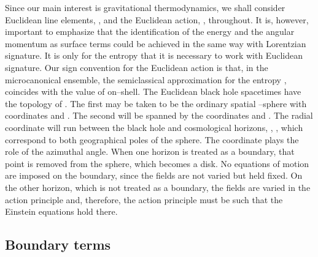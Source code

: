 \documentclass[a4paper,preprintnumbers,amsmath,amssymb]{revtex4}
\begin{document}
Since our main interest is gravitational thermodynamics, we shall consider Euclidean line elements, \coordHE{}, and the Euclidean action, \coordHE{}, throughout. It is, however,
important to emphasize that the identification of the energy and the angular momentum as surface terms could be achieved in the same way with Lorentzian signature. It
is only for the entropy that it is necessary to work with  Euclidean signature. Our sign convention for the Euclidean action is that, in the microcanonical ensemble, the
semiclassical approximation for the entropy \coordHE{}, coincides with the value of \coordHE{} on--shell. The Euclidean black hole spacetimes have the topology of \coordHE{}. The first \coordHE{} may be taken to be the ordinary spatial \coordHE{}--sphere with coordinates \myHighlight{$\theta$}\coordHE{} and \myHighlight{$\phi$}\coordHE{}. The second \coordHE{} will be spanned by the
coordinates \coordHE{} and \coordHE{}. The radial coordinate \coordHE{} will run between the black hole and cosmological horizons, \coordHE{}, \coordHE{}, which correspond to both
geographical poles of the sphere. The coordinate \coordHE{} plays the role of the azimuthal angle. When one horizon is treated as a boundary, that point is
removed from the sphere, which becomes a disk. No equations of motion are imposed on the boundary, since the fields are not varied but held fixed. On the other
horizon, which is not treated as a boundary, the fields are varied in the action principle and, therefore, the action principle must be such that the Einstein equations hold
there.

\subsection*{Boundary terms}
\end{document}
